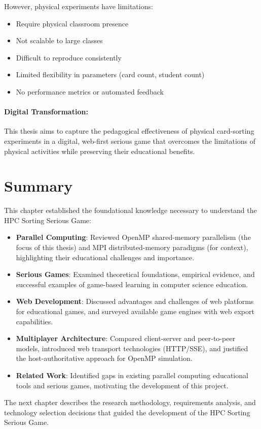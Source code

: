 However, physical experiments have limitations:

\begin{itemize}
    \item Require physical classroom presence
    \item Not scalable to large classes
    \item Difficult to reproduce consistently
    \item Limited flexibility in parameters (card count, student count)
    \item No performance metrics or automated feedback
\end{itemize}

\paragraph*{Digital Transformation:}

This thesis aims to capture the pedagogical effectiveness of physical card-sorting experiments in a digital, web-first serious game that overcomes the limitations of physical activities while preserving their educational benefits.

\section{Summary}
\label{sec:background-summary}

This chapter established the foundational knowledge necessary to understand the HPC Sorting Serious Game:

\begin{itemize}
    \item \textbf{Parallel Computing}: Reviewed OpenMP shared-memory parallelism (the focus of this thesis) and MPI distributed-memory paradigms (for context), highlighting their educational challenges and importance.

    \item \textbf{Serious Games}: Examined theoretical foundations, empirical evidence, and successful examples of game-based learning in computer science education.

    \item \textbf{Web Development}: Discussed advantages and challenges of web platforms for educational games, and surveyed available game engines with web export capabilities.

    \item \textbf{Multiplayer Architecture}: Compared client-server and peer-to-peer models, introduced web transport technologies (HTTP/SSE), and justified the host-authoritative approach for OpenMP simulation.

    \item \textbf{Related Work}: Identified gaps in existing parallel computing educational tools and serious games, motivating the development of this project.
\end{itemize}

The next chapter describes the research methodology, requirements analysis, and technology selection decisions that guided the development of the HPC Sorting Serious Game.
